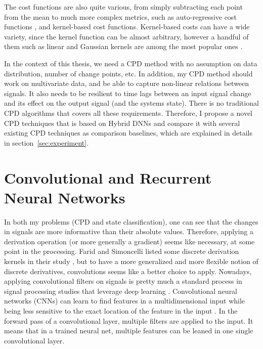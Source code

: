The cost functions are also quite various, from simply subtracting each point from the mean to much more complex metrics, such as auto-regressive cost functions \cite{angelosante2012group}, and kernel-based cost functions. Kernel-based costs can have a wide variety, since the kernel function can be almost arbitrary, however a handful of them such as linear and Gaussian kernels are among the most popular ones \cite{Truong2018ChangePointSurvey}.

In the context of this thesis, we need a CPD method with no assumption on data distribution, number of change points, etc. 
In addition, my CPD method should work on multivariate data, and be able to capture non-linear relations between signals. 
It also needs to be resilient to time lags between an input signal change and its effect on the output signal (and the systems state). There is no traditional CPD algorithms that covers all these requirements.
Therefore, I propose a novel CPD techniques that is based on Hybrid DNNs and compare it with several existing CPD techniques as comparison baselines, which are explained in details in section~\ref{sec:experiment}.   

\section{Convolutional and Recurrent Neural Networks}
In both my problems (CPD and state classification), one can see that the changes in signals are more informative than their absolute values. Therefore, applying a derivation operation (or more generally a gradient) seems like necessary, at some point in the processing. Farid and Simoncelli listed some discrete derivation kernels in their study \cite{Farid2004}, but to have a more generalized and more flexible notion of discrete derivatives, convolutions seems like a better choice to apply. 
Nowadays, applying convolutional filters on signals is pretty much a standard process in signal processing studies that leverage deep learning \cite{morales2016deep, zeng2014convolutional, yang2015deep}. Convolutional neural networks (CNNs) can learn to find features in a multidimensional input while being less sensitive to the exact location of the feature in the input \cite{lecun2015deep}. In the forward pass of a convolutional layer, multiple filters are applied to the input. %
It means that in a trained neural net, multiple features can be leaned in one single convolutional layer.


